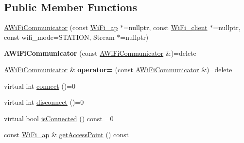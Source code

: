 \subsection*{Public Member Functions}
\begin{DoxyCompactItemize}
\item 
\mbox{\hyperlink{classathome_1_1communication_1_1wifi_1_1_a_wi_fi_communicator_a0098148fe8d0eeee99b7f8f72a72a900}{A\+Wi\+Fi\+Communicator}} (const \mbox{\hyperlink{structathome_1_1communication_1_1wifi_1_1s__wifi__access__point}{Wi\+Fi\+\_\+ap}} $\ast$=nullptr, const \mbox{\hyperlink{structathome_1_1communication_1_1wifi_1_1s__wifi__client}{Wi\+Fi\+\_\+client}} $\ast$=nullptr, const wifi\+\_\+mode=S\+T\+A\+T\+I\+ON, Stream $\ast$=nullptr)
\item 
\mbox{\label{classathome_1_1communication_1_1wifi_1_1_a_wi_fi_communicator_a5d9a73879f80042bf3c0da09ff32f0b5}} 
{\bfseries A\+Wi\+Fi\+Communicator} (const \mbox{\hyperlink{classathome_1_1communication_1_1wifi_1_1_a_wi_fi_communicator}{A\+Wi\+Fi\+Communicator}} \&)=delete
\item 
\mbox{\label{classathome_1_1communication_1_1wifi_1_1_a_wi_fi_communicator_afc2748d9230575335d3cfd7936ff26ee}} 
\mbox{\hyperlink{classathome_1_1communication_1_1wifi_1_1_a_wi_fi_communicator}{A\+Wi\+Fi\+Communicator}} \& {\bfseries operator=} (const \mbox{\hyperlink{classathome_1_1communication_1_1wifi_1_1_a_wi_fi_communicator}{A\+Wi\+Fi\+Communicator}} \&)=delete
\item 
virtual int \mbox{\hyperlink{classathome_1_1communication_1_1wifi_1_1_a_wi_fi_communicator_a309927109fbc19aa0fb2afb71d50bbf9}{connect}} ()=0
\item 
virtual int \mbox{\hyperlink{classathome_1_1communication_1_1wifi_1_1_a_wi_fi_communicator_a6131240ac0daa0f9fb4d46871feea4c2}{disconnect}} ()=0
\item 
virtual bool \mbox{\hyperlink{classathome_1_1communication_1_1wifi_1_1_a_wi_fi_communicator_a578087d01c814481d89ea702a6d7ed01}{is\+Connected}} () const =0
\item 
const \mbox{\hyperlink{structathome_1_1communication_1_1wifi_1_1s__wifi__access__point}{Wi\+Fi\+\_\+ap}} \& \mbox{\hyperlink{classathome_1_1communication_1_1wifi_1_1_a_wi_fi_communicator_abef86486512e4a39d61df3b27effcc87}{get\+Access\+Point}} () const
\item 

\end{DoxyCompactItemize}
